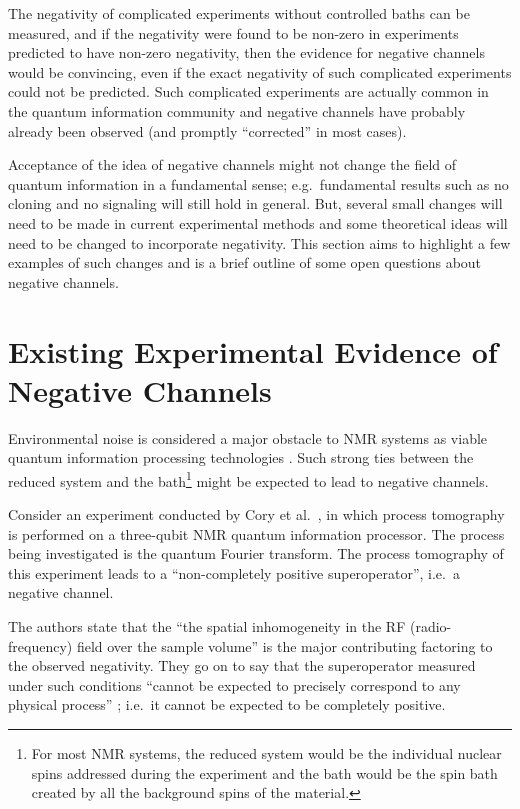 The negativity of complicated experiments without controlled baths can be measured, and if the negativity were found to be non-zero in experiments predicted to have non-zero negativity, then the evidence for negative channels would be convincing, even if the exact negativity of such complicated experiments could not be predicted.  Such complicated experiments are actually common in the quantum information community and negative channels have probably already been observed (and promptly ``corrected'' in most cases).

Acceptance of the idea of negative channels might not change the field of quantum information in a fundamental sense; e.g.\ fundamental results such as no cloning and no signaling will still hold in general.  But, several small changes will need to be made in current experimental methods and some theoretical ideas will need to be changed to incorporate negativity.  This section aims to highlight a few examples of such changes and is a brief outline of some open questions about negative channels.

\section{Existing Experimental Evidence of Negative Channels}
\label{sec:Havel}

Environmental noise is considered a major obstacle to NMR systems as viable quantum information processing technologies \cite{Boulant2004}.  Such strong ties between the reduced system and the bath\footnote{For most NMR systems, the reduced system would be the individual nuclear spins addressed during the experiment and the bath would be the spin bath created by all the background spins of the material.} might be expected to lead to negative channels.

Consider an experiment conducted by Cory et al.\ \cite{Cory2004}, in which process tomography is performed on a three-qubit NMR quantum information processor.  The process being investigated is the quantum Fourier transform.  The process tomography of this experiment leads to a ``non-completely positive superoperator'', i.e.\ a negative channel.  

The authors state that the ``the spatial inhomogeneity in the RF (radio-frequency) field over the sample volume'' \cite{Cory2004} is the major contributing factoring to the observed negativity.  They go on to say that the superoperator measured under such conditions ``cannot be expected to precisely correspond to any physical process'' \cite{Cory2004}; i.e.\ it cannot be expected to be completely positive.    

